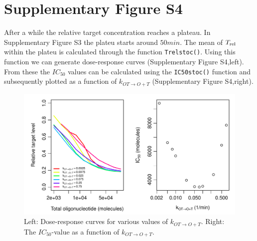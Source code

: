 \documentclass[a4paper,11pt]{article}
\newenvironment{Ncenter}{%
  \setlength\topsep{-10pt}
  \setlength\parskip{-100pt}
  \begin{center}
}{%
  \end{center}
}
\newcommand{\kmo}{k_{OT \to O+T}}
\newcommand{\Trel}{T_{\rm{rel}}}
\begin{document}
\section{Supplementary Figure S4}
After a while the relative target concentration reaches a plateau. In Supplementary Figure S3 the plateu starts around $50min$. The mean of $\Trel$ within the plateu is calculated through the function \texttt{Trelstoc()}. Using this function we can generate dose-response curves (Supplementary Figure S4,left). From these the $IC_{50}$ values can be calculated using the \texttt{IC50stoc()} function and subsequently plotted as a function of $\kmo$ (Supplementary Figure S4,right).
\begin{Schunk}
\end{Schunk}
\begin{figure}[!h]
\begin{Ncenter}
\includegraphics[width=\textwidth]{SuppFile1-IC50.pdf}
\end{Ncenter}
\caption{Left: Dose-response curves for various values of $\kmo$. Right: The $IC_{50}$-value as a function of $\kmo$.}\label{fig:figIC50}
\end{figure}
\newpage

\end{document}
